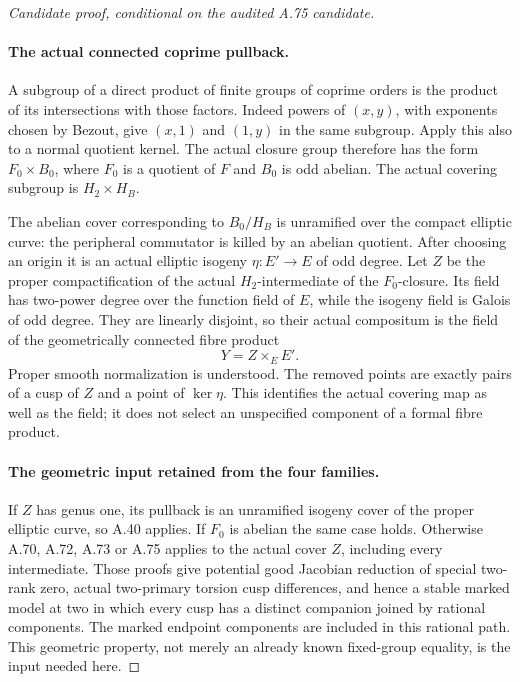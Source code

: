 \begin{proof}[Candidate proof, conditional on the audited A.75 candidate]
\paragraph{The actual connected coprime pullback.}
A subgroup of a direct product of finite groups of coprime
orders is the product of its intersections with those
factors. Indeed powers of \((x,y)\), with exponents
chosen by Bezout, give \((x,1)\) and \((1,y)\) in the
same subgroup. Apply this also to a normal quotient kernel.
The actual closure group therefore has the form
\(F_0\times B_0\), where \(F_0\) is a quotient of
\(F\) and \(B_0\) is odd abelian. The actual covering
subgroup is \(H_2\times H_B\).

The abelian cover corresponding to \(B_0/H_B\) is
unramified over the compact elliptic curve: the peripheral
commutator is killed by an abelian quotient. After choosing
an origin it is an actual elliptic isogeny
\(\eta:E'\to E\) of odd degree. Let \(Z\) be the
proper compactification of the actual \(H_2\)-intermediate
of the \(F_0\)-closure. Its field has two-power degree
over the function field of \(E\), while the isogeny
field is Galois of odd degree. They are linearly disjoint,
so their actual compositum is the field of the geometrically
connected fibre product
\[
                              Y=Z\times_E E'.          \tag{A.76.3}
\]
Proper smooth normalization is understood. The removed
points are exactly pairs of a cusp of \(Z\) and a
point of \(\ker\eta\). This identifies the actual
covering map as well as the field; it does not select
an unspecified component of a formal fibre product.

\paragraph{The geometric input retained from the four families.}
If \(Z\) has genus one, its pullback is an unramified
isogeny cover of the proper elliptic curve, so A.40 applies.
If \(F_0\) is abelian the same case holds. Otherwise
A.70, A.72, A.73 or A.75 applies to the actual cover
\(Z\), including every intermediate. Those proofs give
potential good Jacobian reduction of special two-rank zero,
actual two-primary torsion cusp differences, and hence a
stable marked model at two in which every cusp has a
distinct companion joined by rational components. The
marked endpoint components are included in this rational
path. This geometric property, not merely an already
known fixed-group equality, is the input needed here.


\end{proof}
